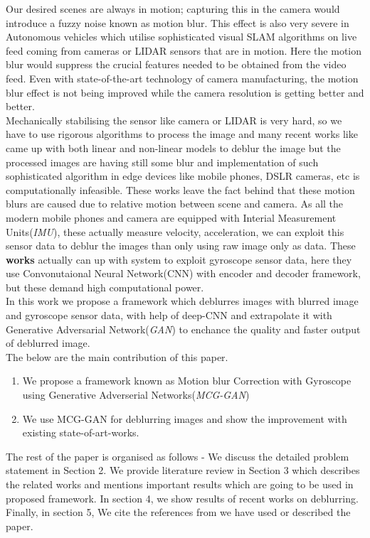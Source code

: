 \documentclass[10pt,twocolumn,letterpaper]{article}
\begin{document}
Our desired scenes are always in motion; capturing this in the camera would introduce a fuzzy noise known as motion blur. This effect is also very severe in Autonomous vehicles which utilise sophisticated visual SLAM algorithms on live feed coming from cameras or LIDAR sensors that are in motion. Here the motion blur would suppress the crucial features needed to be obtained from the video feed. Even with state-of-the-art technology of camera manufacturing, the motion blur effect is not being improved while the camera resolution is getting better and better.\\

Mechanically stabilising the sensor like camera or LIDAR is very hard, so we have to use rigorous algorithms to process the image and many recent works like {} came up with both linear and non-linear models to deblur the image but the processed images are having still some blur and implementation of such sophisticated algorithm in edge devices like mobile phones, DSLR cameras, etc is computationally infeasible. These works leave the fact behind that these motion blurs are caused due to relative motion between scene and camera. As all the modern mobile phones and camera are equipped with Interial Measurement Units(\textit{IMU}), these actually measure velocity, acceleration, we can exploit this sensor data to deblur the images than only using raw image only as data. These \textbf{works} actually can up with system to exploit gyroscope sensor data, here they use Convonutaional Neural Network(CNN) with encoder and decoder framework, but these demand high computational power.\\

In this work we propose a framework which deblurres images with blurred image and gyroscope sensor data, with help of deep-CNN and extrapolate it with Generative Adversarial Network(\textit{GAN}) to enchance the quality and faster output of deblurred image.\\
The below are the main contribution of this paper.
\begin{enumerate}
	\item We propose a framework known as Motion blur Correction with Gyroscope using Generative Adverserial Networks(\textit{MCG-GAN})
	\item We use MCG-GAN for deblurring images and show the improvement with existing state-of-art-works.
\end{enumerate}
The rest of the paper is organised as follows - We discuss the detailed problem statement in Section 2. We provide literature review in Section 3 which describes the related works and mentions important results which are going to be used in proposed framework. In section 4, we show results of recent works on deblurring. Finally, in section 5, We cite the references from we have used or described the paper.
\end{document}
